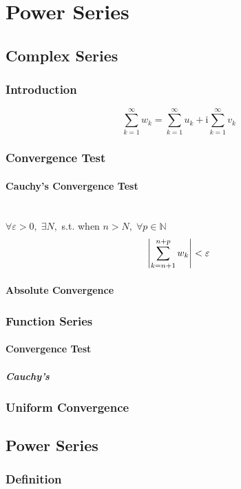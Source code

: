 \documentclass[UTF8]{ctexart} %
\renewcommand{\I}{\mathrm{i}}
\numberwithin{equation}{section}
\begin{document}
\section{Power Series}
\subsection{Complex Series}
\subsubsection{Introduction}
\begin{equation}\label{key}
\sum_{k=1}^\infty w_k = \sum_{k=1}^\infty u_k + \I\sum_{k=1}^\infty v_k
\end{equation}
\subsubsection{Convergence Test}
\paragraph{Cauchy's Convergence Test}~\\
$\forall \varepsilon>0,\;\exists N,$ s.t. when $n>N,\;\forall p\in \mathbb{N}$
\begin{equation}\label{key}
\abs{\sum_{k=n+1}^{n+p} w_k}<\varepsilon
\end{equation}
\paragraph{Absolute Convergence}
\subsubsection{Function Series}
\paragraph{Convergence Test}
\subparagraph{Cauchy's}
\subsubsection{Uniform Convergence}

\subsection{Power Series}
\subsubsection{Definition}
\end{document}
